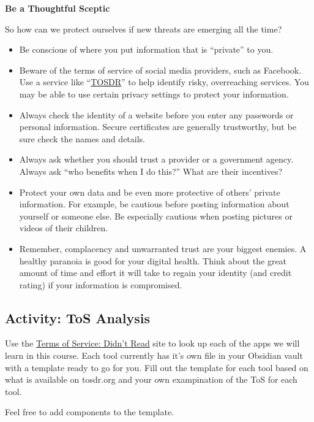 \documentclass[
]{book}
\providecommand{\tightlist}{%
  \setlength{\itemsep}{0pt}\setlength{\parskip}{0pt}}
\theoremstyle{definition}
\theoremstyle{definition}
\theoremstyle{definition}
\theoremstyle{definition}
\theoremstyle{remark}
\begin{document}
\textbf{Be a Thoughtful Sceptic}

So how can we protect ourselves if new threats are emerging all the time?

\begin{itemize}
\tightlist
\item
  Be conscious of where you put information that is ``private'' to you.\\
\item
  Beware of the terms of service of social media providers, such as Facebook. Use a service like ``\href{https://tosdr.org/}{TOSDR}'' to help identify risky, overreaching services. You may be able to use certain privacy settings to protect your information.\\
\item
  Always check the identity of a website before you enter any passwords or personal information. Secure certificates are generally trustworthy, but be sure check the names and details.\\
\item
  Always ask whether you should trust a provider or a government agency. Always ask ``who benefits when I do this?'' What are their incentives?\\
\item
  Protect your own data and be even more protective of others' private information. For example, be cautious before posting information about yourself or someone else. Be especially cautious when posting pictures or videos of their children.\\
\item
  Remember, complacency and unwarranted trust are your biggest enemies. A healthy paranoia is good for your digital health. Think about the great amount of time and effort it will take to regain your identity (and credit rating) if your information is compromised.
\end{itemize}

\hypertarget{activity-tos-analysis}{%
\subsection*{Activity: ToS Analysis}\label{activity-tos-analysis}}

\begin{reflect}
Use the \href{https://tosdr.org/}{Terms of Service: Didn't Read} site to look up each of the apps we will learn in this course. Each tool currently has it's own file in your Obsidian vault with a template ready to go for you. Fill out the template for each tool based on what is available on tosdr.org and your own exampination of the ToS for each tool.

Feel free to add components to the template.
\end{reflect}
\end{document}
